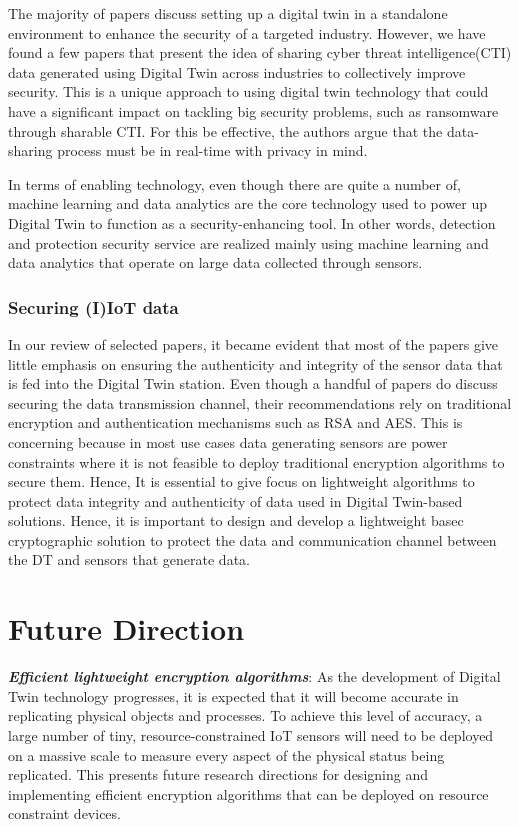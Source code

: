 The majority of papers discuss setting up a digital twin in a standalone environment to enhance the security of a targeted industry. However, we have found a few papers that present the idea of sharing cyber threat intelligence(CTI) data generated using Digital Twin across industries to collectively improve security. This is a unique approach to using digital twin technology that could have a significant impact on tackling big security problems, such as ransomware through sharable CTI. For this be effective, the authors argue that the data-sharing process must be in real-time with privacy in mind. 


In terms of enabling technology, even though there are quite a number of, machine learning and data analytics are the core technology used to power up Digital Twin to function as a security-enhancing tool. In other words, detection and protection security service are realized mainly using machine learning and data analytics that operate on large data collected through sensors. 


\subsubsection{Securing (I)IoT data}
In our review of selected papers, it became evident that most of the papers give little emphasis on ensuring the authenticity and integrity of the sensor data that is fed into the Digital Twin station. Even though a handful of papers do discuss securing the data transmission channel, their recommendations rely on traditional encryption and authentication mechanisms such as RSA and AES. This is concerning because in most use cases data generating sensors are power constraints where it is not feasible to deploy traditional encryption algorithms to secure them. Hence, It is essential to give focus on lightweight algorithms to protect data integrity and authenticity of data used in Digital Twin-based solutions. Hence, it is important to design and develop a lightweight basec cryptographic solution to protect the data and communication channel between the DT and sensors that generate data.  




\section{Future Direction}

\textbf{\textit{Efficient lightweight encryption algorithms}}: As the development of Digital Twin technology progresses, it is expected that it will become accurate in replicating physical objects and processes. To achieve this level of accuracy, a large number of tiny, resource-constrained IoT sensors will need to be deployed on a massive scale to measure every aspect of the physical status being replicated. This presents future research directions for designing and implementing  efficient encryption algorithms that can be deployed on resource constraint devices.


